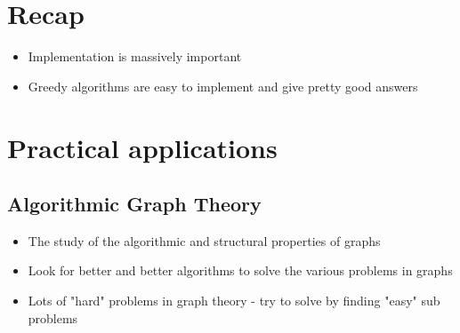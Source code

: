 \documentclass{article}[18pt]
\begin{document}
\section{Recap}
\begin{itemize}
	\item Implementation is massively important
	\item Greedy algorithms are easy to implement and give pretty good answers
\end{itemize}
\section{Practical applications}
\subsection{Algorithmic Graph Theory}
\begin{itemize}
	\item The study of the algorithmic and structural properties of graphs
	\item Look for better and better algorithms to solve the various problems in graphs
	\item Lots of "hard" problems in graph theory - try to solve by finding "easy" sub problems
\end{itemize}
\end{document}

